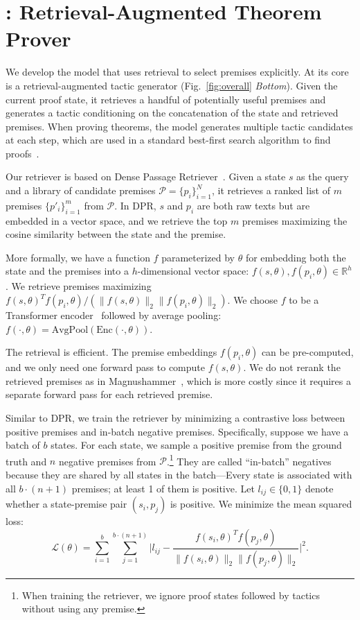 \section{{\name}: Retrieval-Augmented Theorem Prover}
\label{sec:reprover}


We develop the {\name} model that uses retrieval to select premises explicitly. At its core is a retrieval-augmented tactic generator (Fig.~\ref{fig:overall} \emph{Bottom}). Given the current proof state, it retrieves a handful of potentially useful premises and generates a tactic conditioning on the concatenation of the state and retrieved premises. When proving theorems, the model generates multiple tactic candidates at each step, which are used in a standard best-first search algorithm to find proofs~\cite{han2022proof,zheng2022minif2f,polu2023formal,jiang2022thor}. 


Our retriever is based on Dense Passage Retriever~\cite{karpukhin2020dense}. Given a state $s$ as the query and a library of candidate premises $\mathcal{P} = \{p_i\}_{i=1}^{N}$, it retrieves a ranked list of $m$ premises $\{p'_i\}_{i=1}^{m}$ from $\mathcal{P}$. In DPR, $s$ and $p_i$ are both raw texts but are embedded in a vector space, and we retrieve the top $m$ premises maximizing the cosine similarity between the state and the premise.

More formally, we have a function $f$ parameterized by $\theta$ for embedding both the state and the premises into a $h$-dimensional vector space: $f(s, \theta), f(p_i, \theta) \in \mathbb{R}^{h}$. We retrieve premises maximizing $f(s, \theta)^T f(p_i, \theta)/(\lVert f(s, \theta) \rVert_2 \lVert f(p_i, \theta) \rVert_2)$. We choose $f$ to be a Transformer encoder~\cite{vaswani2017attention} followed by average pooling: $f(\cdot, \theta) = \textrm{AvgPool}(\textrm{Enc}(\cdot, \theta))$.

The retrieval is efficient. The premise embeddings $f(p_i, \theta)$ can be pre-computed, and we only need one forward pass to compute $f(s, \theta)$. We do not rerank the retrieved premises as in Magnushammer~\cite{mikula2023magnushammer}, which is more costly since it requires a separate forward pass for each retrieved premise.

Similar to DPR, we train the retriever by minimizing a contrastive loss between positive premises and in-batch negative premises. Specifically, suppose we have a batch of $b$ states. For each state, we sample a positive premise from the ground truth and $n$ negative premises from $\mathcal{P}$.\footnote{When training the retriever, we ignore proof states followed by tactics without using any premise.} They are called ``in-batch'' negatives because they are shared by all states in the batch---Every state is associated with all $b \cdot (n+1)$ premises; at least 1 of them is positive.
Let $l_{ij} \in \{0, 1\}$ denote whether a state-premise pair $(s_i, p_j)$ is positive. We minimize the mean squared loss: 
\begin{equation}
\mathcal{L(\theta)} = \sum_{i=1}^{b} \sum_{j=1}^{b \cdot (n + 1)} \Big\lvert l_{ij} - \frac{f(s_i, \theta)^T f(p_j, \theta)}{\lVert f(s_i, \theta) \rVert_2 \lVert f(p_j, \theta) \rVert_2} \Big\rvert^{2}.
\end{equation}



